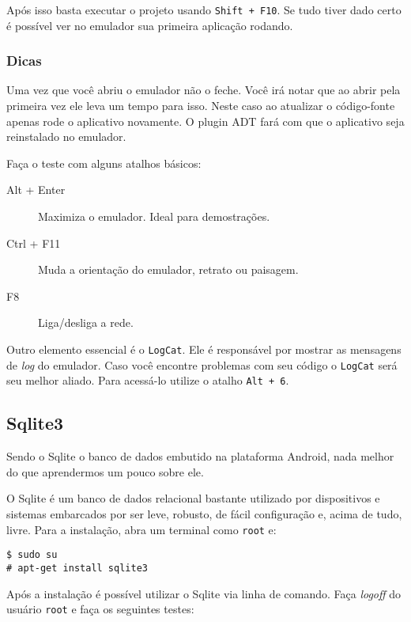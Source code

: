 Após isso basta executar o projeto usando \texttt{Shift + F10}.
Se tudo tiver dado certo é possível ver no emulador sua primeira aplicação rodando.

\subsubsection{Dicas}

Uma vez que você abriu o emulador não o feche. Você irá notar que ao abrir
pela primeira vez ele leva um tempo para isso. Neste caso ao atualizar o código-fonte apenas
rode o aplicativo novamente. O plugin ADT fará com que o aplicativo seja reinstalado no emulador.

Faça o teste com alguns atalhos básicos:
\begin{description}
	\item[Alt + Enter] Maximiza o emulador. Ideal para demostrações.
	\item[Ctrl + F11] Muda a orientação do emulador, retrato ou paisagem.
	\item[F8] Liga/desliga a rede.
\end{description}

Outro elemento essencial é o \texttt{LogCat}. Ele é responsável por mostrar
as mensagens de \textit{log} do emulador. Caso você encontre problemas com seu código o \texttt{LogCat}
será seu melhor aliado. Para acessá-lo utilize o atalho \texttt{Alt + 6}.

\subsection{Sqlite3}

Sendo o Sqlite o banco de dados embutido na plataforma Android, nada melhor do que aprendermos um pouco
sobre ele.

O Sqlite é um banco de dados relacional bastante utilizado por dispositivos e sistemas embarcados por
ser leve, robusto, de fácil configuração e, acima de tudo, livre. Para a instalação, abra um terminal
como \texttt{root} e:

\begin{flushleft}
\texttt{\$ sudo su \\
\# apt-get install sqlite3 \\}
\end{flushleft}

Após a instalação é possível utilizar o Sqlite via linha de comando. Faça \textit{logoff} do usuário
\texttt{root} e faça os seguintes testes:

